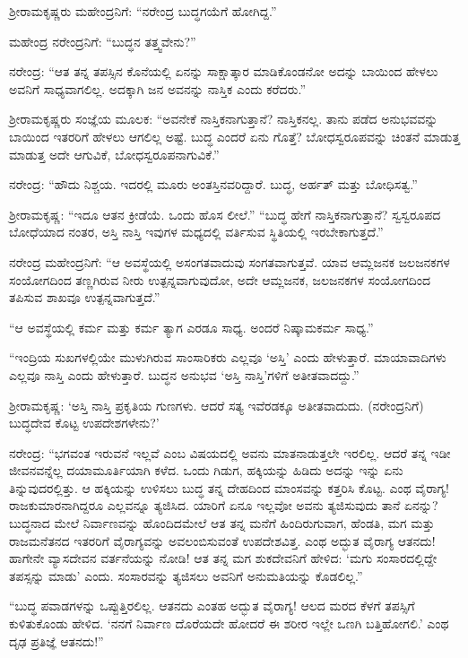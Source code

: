 ಶ‍್ರೀರಾಮಕೃಷ್ಣರು ಮಹೇಂದ್ರನಿಗೆ: “ನರೇಂದ್ರ ಬುದ್ಧಗಯೆಗೆ ಹೋಗಿದ್ದ.”

ಮಹೇಂದ್ರ ನರೇಂದ್ರನಿಗೆ: “ಬುದ್ಧನ ತತ್ತ್ವವೇನು?”

ನರೇಂದ್ರ: “ಆತ ತನ್ನ ತಪಸ್ಸಿನ ಕೊನೆಯಲ್ಲಿ ಏನನ್ನು ಸಾಕ್ಷಾತ್ಕಾರ ಮಾಡಿಕೊಂಡನೋ ಅದನ್ನು ಬಾಯಿಂದ ಹೇಳಲು ಅವನಿಗೆ ಸಾಧ್ಯವಾಗಲಿಲ್ಲ. ಅದಕ್ಕಾಗಿ ಜನ ಅವನನ್ನು ನಾಸ್ತಿಕ ಎಂದು ಕರೆದರು.”

ಶ‍್ರೀರಾಮಕೃಷ್ಣರು ಸಂಜ್ಞೆಯ ಮೂಲಕ: “ಅವನೇಕೆ ನಾಸ್ತಿಕನಾಗುತ್ತಾನೆ? ನಾಸ್ತಿಕನಲ್ಲ. ತಾನು ಪಡೆದ ಅನುಭವವನ್ನು ಬಾಯಿಂದ ಇತರರಿಗೆ ಹೇಳಲು ಆಗಲಿಲ್ಲ ಅಷ್ಟೆ. ಬುದ್ಧ ಎಂದರೆ ಏನು ಗೊತ್ತೆ? ಬೋಧಸ್ವರೂಪವನ್ನು ಚಿಂತನೆ ಮಾಡುತ್ತ ಮಾಡುತ್ತ ಅದೇ ಆಗುವಿಕೆ, ಬೋಧಸ್ವರೂಪನಾಗುವಿಕೆ.”

ನರೇಂದ್ರ: “ಹೌದು ನಿಶ್ಚಯ. ಇದರಲ್ಲಿ ಮೂರು ಅಂತಸ್ತಿನವರಿದ್ದಾರೆ. ಬುದ್ಧ, ಅರ್ಹತ್ ಮತ್ತು ಬೋಧಿಸತ್ವ.”

ಶ‍್ರೀರಾಮಕೃಷ್ಣ: “ಇದೂ ಆತನ ಕ್ರೀಡೆಯೆ. ಒಂದು ಹೊಸ ಲೀಲೆ.” “ಬುದ್ಧ ಹೇಗೆ ನಾಸ್ತಿಕನಾಗುತ್ತಾನೆ? ಸ್ವಸ್ವರೂಪದ ಬೋಧೆಯಾದ ನಂತರ, ಅಸ್ತಿ ನಾಸ್ತಿ ಇವುಗಳ ಮಧ್ಯದಲ್ಲಿ ವರ್ತಿಸುವ ಸ್ಥಿತಿಯಲ್ಲಿ ಇರಬೇಕಾಗುತ್ತದೆ.”

ನರೇಂದ್ರ ಮಹೇಂದ್ರನಿಗೆ: “ಆ ಅವಸ್ಥೆಯಲ್ಲಿ ಅಸಂಗತವಾದುವು ಸಂಗತವಾಗುತ್ತವೆ. ಯಾವ ಆಮ್ಲಜನಕ ಜಲಜನಕಗಳ ಸಂಯೋಗದಿಂದ ತಣ್ಣಗಿರುವ ನೀರು ಉತ್ಪನ್ನವಾಗುವುದೋ, ಅದೇ ಆಮ್ಲಜನಕ, ಜಲಜನಕಗಳ ಸಂಯೋಗದಿಂದ ತಪಿಸುವ ಶಾಖವೂ ಉತ್ಪನ್ನವಾಗುತ್ತದೆ.”

“ಆ ಅವಸ್ಥೆಯಲ್ಲಿ ಕರ್ಮ ಮತ್ತು ಕರ್ಮ ತ್ಯಾಗ ಎರಡೂ ಸಾಧ್ಯ. ಅಂದರೆ ನಿಷ್ಕಾಮಕರ್ಮ ಸಾಧ್ಯ.”

“ಇಂದ್ರಿಯ ಸುಖಗಳಲ್ಲಿಯೇ ಮುಳುಗಿರುವ ಸಾಂಸಾರಿಕರು ಎಲ್ಲವೂ ‘ಅಸ್ತಿ’ ಎಂದು ಹೇಳುತ್ತಾರೆ. ಮಾಯಾವಾದಿಗಳು ಎಲ್ಲವೂ ನಾಸ್ತಿ ಎಂದು ಹೇಳುತ್ತಾರೆ. ಬುದ್ಧನ ಅನುಭವ ‘ಅಸ್ತಿ ನಾಸ್ತಿ’ಗಳಿಗೆ ಅತೀತವಾದದ್ದು.”

ಶ‍್ರೀರಾಮಕೃಷ್ಣ: ‘ಅಸ್ತಿ ನಾಸ್ತಿ ಪ್ರಕೃತಿಯ ಗುಣಗಳು. ಆದರೆ ಸತ್ಯ ಇವೆರಡಕ್ಕೂ ಅತೀತವಾದುದು. (ನರೇಂದ್ರನಿಗೆ) ಬುದ್ಧದೇವ ಕೊಟ್ಟ ಉಪದೇಶಗಳೇನು?’

ನರೇಂದ್ರ: “ಭಗವಂತ ಇರುವನೆ ಇಲ್ಲವೆ ಎಂಬ ವಿಷಯದಲ್ಲಿ ಅವನು ಮಾತನಾಡುತ್ತಲೇ ಇರಲಿಲ್ಲ. ಆದರೆ ತನ್ನ ಇಡೀ ಜೀವನವನ್ನೆಲ್ಲ ದಯಾಮೂರ್ತಿಯಾಗಿ ಕಳೆದ. ಒಂದು ಗಿಡುಗ, ಹಕ್ಕಿಯನ್ನು ಹಿಡಿದು ಅದನ್ನು ಇನ್ನು ಏನು ತಿನ್ನುವುದರಲ್ಲಿತ್ತು. ಆ ಹಕ್ಕಿಯನ್ನು ಉಳಿಸಲು ಬುದ್ಧ ತನ್ನ ದೇಹದಿಂದ ಮಾಂಸವನ್ನು ಕತ್ತರಿಸಿ ಕೊಟ್ಟ. ಎಂಥ ವೈರಾಗ್ಯ! ರಾಜಕುಮಾರನಾಗಿದ್ದರೂ ಎಲ್ಲವನ್ನೂ ತ್ಯಜಿಸಿದ. ಯಾರಿಗೆ ಏನೂ ಇಲ್ಲವೋ ಅವನು ತ್ಯಜಿಸುವುದು ತಾನೆ ಏನನ್ನು? ಬುದ್ಧನಾದ ಮೇಲೆ ನಿರ್ವಾಣವನ್ನು ಹೊಂದಿದಮೇಲೆ ಆತ ತನ್ನ ಮನೆಗೆ ಹಿಂದಿರುಗುವಾಗ, ಹೆಂಡತಿ, ಮಗ ಮತ್ತು ರಾಜಮನೆತನದ ಇತರರಿಗೆ ವೈರಾಗ್ಯವನ್ನು ಅವಲಂಬಿಸುವಂತೆ ಉಪದೇಶವಿತ್ತ. ಎಂಥ ಅದ್ಭುತ ವೈರಾಗ್ಯ ಆತನದು! ಹಾಗೇನೇ ವ್ಯಾಸದೇವನ ವರ್ತನೆಯನ್ನು ನೋಡಿ! ಆತ ತನ್ನ ಮಗ ಶುಕದೇವನಿಗೆ ಹೇಳಿದ: ‘ಮಗು ಸಂಸಾರದಲ್ಲಿದ್ದೇ ತಪಸ್ಸನ್ನು ಮಾಡು’ ಎಂದು. ಸಂಸಾರವನ್ನು ತ್ಯಜಿಸಲು ಅವನಿಗೆ ಅನುಮತಿಯನ್ನು ಕೊಡಲಿಲ್ಲ.”

\newpage

“ಬುದ್ಧ ಪವಾಡಗಳನ್ನು ಒಪ್ಪುತ್ತಿರಲಿಲ್ಲ. ಆತನದು ಎಂತಹ ಅದ್ಭುತ ವೈರಾಗ್ಯ! ಆಲದ ಮರದ ಕೆಳಗೆ ತಪಸ್ಸಿಗೆ ಕುಳಿತುಕೊಂಡು ಹೇಳಿದ. ‘ನನಗೆ ನಿರ್ವಾಣ ದೊರೆಯದೇ ಹೋದರೆ ಈ ಶರೀರ ಇಲ್ಲೇ ಒಣಗಿ ಬತ್ತಿಹೋಗಲಿ.’ ಎಂಥ ದೃಢ ಪ್ರತಿಜ್ಞೆ ಆತನದು!”

